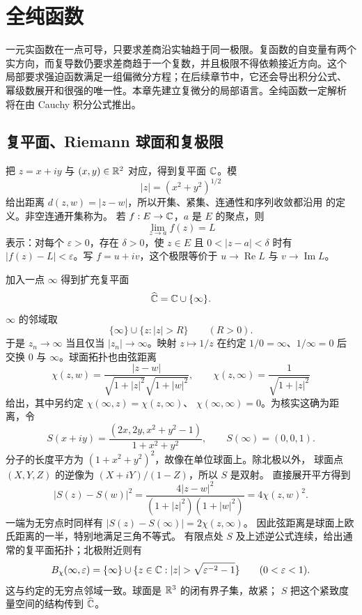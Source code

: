\chapter{全纯函数}
\label{chap:holomorphic-functions}

一元实函数在一点可导，只要求差商沿实轴趋于同一极限。复函数的自变量有两个
实方向，而复导数仍要求差商趋于一个复数，并且极限不得依赖接近方向。这个
局部要求强迫函数满足一组偏微分方程；在后续章节中，它还会导出积分公式、
幂级数展开和很强的唯一性。本章先建立复微分的局部语言。全纯函数一定解析
将在由 Cauchy 积分公式推出。

\section{复平面、Riemann 球面和复极限}

把 \(z=x+iy\) 与 \((x,y)\in\mathbb{R}^2\) 对应，得到复平面 \(\mathbb{C}\)。模
\[
 |z|=(x^2+y^2)^{1/2}
\]
给出距离 \(d(z,w)=|z-w|\)，所以开集、紧集、连通性和序列收敛都沿用
的定义。非空连通开集称为。
若 \(f:E\to\mathbb{C}\)，\(a\) 是 \(E\) 的聚点，则
\[
 \lim_{z\to a}f(z)=L
\]
表示：对每个 \(\varepsilon>0\)，存在 \(\delta>0\)，使 \(z\in E\) 且
\(0<|z-a|<\delta\) 时有 \(|f(z)-L|<\varepsilon\)。写
\(f=u+iv\)，这个极限等价于
\(u\to\operatorname{Re}L\) 与 \(v\to\operatorname{Im}L\)。

加入一点 \(\infty\) 得到扩充复平面
\[
 \widehat{\mathbb{C}}=\mathbb{C}\cup\{\infty\}.
\]
\(\infty\) 的邻域取
\[
 \{\infty\}\cup\{z:|z|>R\}\qquad(R>0).
\]
于是 \(z_n\to\infty\) 当且仅当 \(|z_n|\to\infty\)。映射
\(z\mapsto1/z\) 在约定 \(1/0=\infty\)、\(1/\infty=0\) 后交换 \(0\)
与 \(\infty\)。球面拓扑也由弦距离
\[
 \chi(z,w)=\frac{|z-w|}
 {\sqrt{1+|z|^2}\sqrt{1+|w|^2}},\qquad
 \chi(z,\infty)=\frac1{\sqrt{1+|z|^2}}
\]
给出，其中另约定 \(\chi(\infty,z)=\chi(z,\infty)\)、
\(\chi(\infty,\infty)=0\)。为核实这确为距离，令
\[
 S(x+iy)=\frac{(2x,2y,x^2+y^2-1)}{1+x^2+y^2},
 \qquad S(\infty)=(0,0,1).
\]
分子的长度平方为 \((1+x^2+y^2)^2\)，故像在单位球面上。除北极以外，
球面点 \((X,Y,Z)\) 的逆像为 \((X+iY)/(1-Z)\)，所以 \(S\) 是双射。
直接展开平方得到
\[
 |S(z)-S(w)|^2
 =\frac{4|z-w|^2}{(1+|z|^2)(1+|w|^2)}
 =4\chi(z,w)^2.
\]
一端为无穷点时同样有 \(|S(z)-S(\infty)|=2\chi(z,\infty)\)。
因此弦距离是球面上欧氏距离的一半，特别地满足三角不等式。
有限点处 \(S\) 及上述逆公式连续，给出通常的复平面拓扑；北极附近则有
\[
 B_\chi(\infty,\varepsilon)
 =\{\infty\}\cup
 \{z\in\C:|z|>\sqrt{\varepsilon^{-2}-1}\}
 \qquad(0<\varepsilon<1).
\]
这与约定的无穷点邻域一致。球面是 \(\mathbb{R}^3\) 的闭有界子集，故紧；
\(S\) 把这个紧致度量空间的结构传到 \(\widehat{\mathbb{C}}\)。

